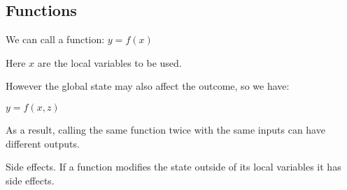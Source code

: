 
\subsection{Functions}

We can call a function:
\(y=f(x)\)

Here \(x\) are the local variables to be used.

However the global state may also affect the outcome, so we have:

\(y=f(x,z)\)

As a result, calling the same function twice with the same inputs can have different outputs.

Side effects. If a function modifies the state outside of its local variables it has side effects.

